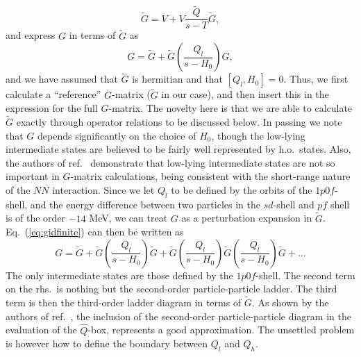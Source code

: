 \documentclass{article}
\begin{document}
\begin{equation}
     \tilde{G}=V+V\frac{\tilde{Q}}{s -T}\tilde{G},
\label{eq:gfinite}
\end{equation}
and  express $G$ in terms of $\tilde{G}$ as
\begin{equation}
        G=\tilde{G} +\tilde{G}
        \left(\frac{Q_l}{s -H_0}\right)G,
        \label{eq:gidfinite}
\end{equation}
and we have assumed that $\tilde{G}$ is hermitian and that $[Q_l,H_0]=0$.
Thus, we first calculate
a ``reference'' $G$-matrix ($\tilde{G}$ in our case), and then insert this
in the expression for the full $G$-matrix. The novelty here is that
we are able to calculate $\tilde{G}$ exactly through operator relations
to be discussed below. In passing we note that $G$ depends significantly
on the choice of $H_0$, though the low-lying intermediate states
are believed to be fairly well represented by h.o.\ states.
Also, the authors of ref.\ \cite{kkko76} demonstrate that low-lying
intermediate states are not so important in $G$-matrix calculations,
being consistent with the short-range nature of the $NN$ interaction.
Since we let $Q_l$ to be defined by the orbits of the $1p0f$-shell,
and the energy difference between two particles in the
$sd$-shell and $pf$ shell is of the order $-14$ MeV, we can treat
$G$ as a perturbation expansion in $\tilde{G}$.
Eq.\ (\ref{eq:gidfinite}) can then be written as
\begin{equation}
        G=\tilde{G} +\tilde{G}
        \left(\frac{Q_l}{s -H_0}\right)\tilde{G}
        +\tilde{G}
        \left(\frac{Q_l}{s -H_0}\right)\tilde{G}
        \left(\frac{Q_l}{s -H_0}\right)\tilde{G} +\dots
\end{equation}
The only intermediate states are those defined by the $1p0f$-shell.
The second term on the rhs.\ is nothing but the second-order
particle-particle ladder. The third term is then the third-order ladder
diagram in terms of
$\tilde{G}$. As shown by the authors of ref.\ \cite{kkko76}, the inclusion
of the second-order particle-particle diagram in the evaluation
of the $\hat{Q}$-box, represents a good approximation.
The unsettled problem is however how to define
the boundary between
$Q_l$ and $Q_h$.
\end{document}

